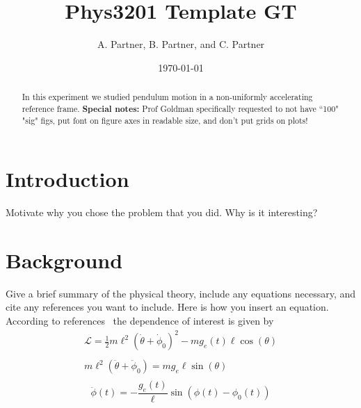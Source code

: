 \documentclass[letterpaper,12pt]{article}
\begin{document}
\title{Phys3201 Template GT}
\author{A. Partner, B. Partner, and C. Partner}
\date{\today}
\maketitle

\begin{abstract}
In this experiment we studied pendulum motion in a non-uniformly accelerating reference frame. \textbf{Special notes:} Prof Goldman specifically requested to not have ``100" "sig" figs, put font on figure axes in readable size, and don't put grids on plots!
\end{abstract}


\section{Introduction}

Motivate why you chose the problem that you did. Why is it interesting? 

\blindtext %


\section{Background}

Give a brief summary of the physical theory, include any equations necessary, and cite any references you want to include. Here is how you insert an equation. According to
references~\cite{melissinos, Cyr, Wiki} the dependence of interest is given
by
\begin{gather*}
   \mathcal{L} =  \frac{1}{2} m \ell^2 ( \dot{\theta}+\dot{\phi}_0)^2 - m g_e(t) \ell \cos(\theta)\\
   \\
   m\ell^2 (\ddot{\theta} + \ddot{\phi}_0) = mg_e\ell\sin(\theta)\\
\end{gather*}
\begin{equation}
   \ddot{\phi}(t) = -\frac{g_e(t)}{\ell} \sin\left(\phi(t)-\phi_0(t)\right)
   \label{Eq:equation1} %
\end{equation}
\end{document}
